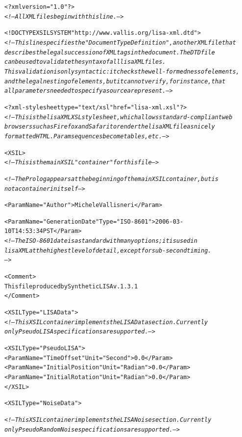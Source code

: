\documentclass[11pt]{report}
\begin{document}
\begin{alltt}
<?xml version="1.0"?>
\textsl{<!-- All XML files begin with this line. -->}

<!DOCTYPE XSIL SYSTEM "http://www.vallis.org/lisa-xml.dtd">
\textsl{<!-- This line specifies the "Document Type Definition", another XML file that 
     describes the legal succession of XML tags in the document. The DTD file
     can be used to validate the syntax of all lisaXML files.
     This validation is only syntactic: it checks the well-formedness of elements,
     and the legal nesting of elements, but it cannot verify, for instance, that
     all parameters needed to specify a source are present. -->}

<?xml-stylesheet type="text/xsl" href="lisa-xml.xsl"?>
\textsl{<!-- This is the lisaXML XSL stylesheet, which allows standard-compliant web
     browsers such as Firefox and Safari to render the lisaXML file as nicely
     formatted HTML. Param sequences become tables, etc. -->}
     
<XSIL>
    \textsl{<!-- This is the main XSIL "container" for this file -->}

    \textsl{<!-- The Prolog appears at the beginning of the main XSIL container, but is
         not a container in itself -->}

    <Param Name="Author">Michele Vallisneri</Param>


    <Param Name="GenerationDate" Type="ISO-8601">2006-03-10T14:53:34PST</Param>
    \textsl{<!-- The ISO-8601 date is a standard with many options; it is used in
         lisaXML at the highest level of detail, except for sub-second timing.
         -->}


    <Comment>
        This file produced by Synthetic LISA v. 1.3.1
    </Comment>

    <XSIL Type="LISAData">
        \textsl{<!-- This XSIL container implements the LISA Data section. Currently
             only PseudoLISA specifications are supported. -->}

        <XSIL Type="PseudoLISA">
            <Param Name="TimeOffset" Unit="Second">0.0</Param>
            <Param Name="InitialPosition" Unit="Radian">0.0</Param>
            <Param Name="InitialRotation" Unit="Radian">0.0</Param>
        </XSIL>


    <XSIL Type="NoiseData">

        \textsl{<!-- This XSIL container implements the LISA Noise section. Currently
             only PseudoRandomNoise specifications are supported. -->}


\end{alltt}
\end{document}
